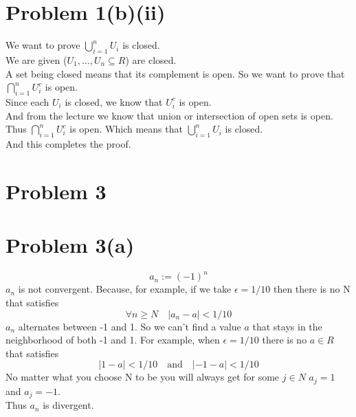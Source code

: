 \documentclass{article}
\begin{document}
\section*{Problem 1(b)(ii)}
We want to prove \(\bigcup_{i = 1}^n U_i\) is closed.\\
We are given (\(U_1,...,U_n \subseteq R\)) are closed. \\
A set being closed means that its complement is open. So we want to prove that \(\bigcap_{i = 1}^n U_i^c\) is open.\\
Since each \(U_i\) is closed, we know that \(U_i^c\) is open.\\
And from the lecture we know that union or intersection of open sets is open. Thus \(\bigcap_{i = 1}^n U_i^c\) is open. Which means that \(\bigcup_{i = 1}^n U_i\) is closed.\\
And this completes the proof.\\

\section*{Problem 3}

\section*{Problem 3(a)}
\[
   a_n := (-1)^n
\]
\(a_n\) is not convergent. Because, for example, if we take \(\epsilon = 1/10\) then there is no N that satisfies
\[
   \forall n \geq N \quad |a_n - a| < 1/10
\]
\(a_n\) alternates between -1 and 1. So we can't find a value \(a\) that stays in the neighborhood of both -1 and 1.
For example, when \(\epsilon = 1/10\) there is no \(a \in R\) that satisfies
\[
   |1 - a| < 1/10 \quad \text{and} \quad |-1 - a| < 1/10
\]
No matter what you choose N to be you will always get for some \(j \in N\) \(a_j = 1\) and \(a_j = -1\). \\
Thus \(a_n\) is divergent.\\
\end{document}
